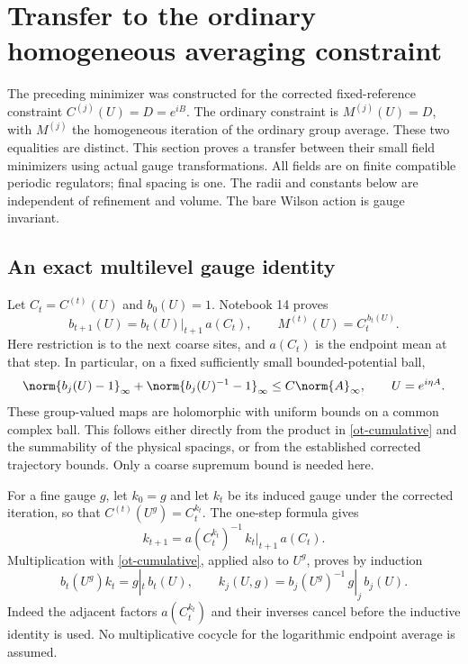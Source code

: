 \section{Transfer to the ordinary homogeneous averaging constraint}
\label{ot-section}

The preceding minimizer was constructed for the corrected
fixed-reference constraint $C^{(j)}(U)=D=e^{iB}$. The ordinary
constraint is $M^{(j)}(U)=D$, with $M^{(j)}$ the homogeneous
iteration of the ordinary group average. These two equalities
are distinct. This section proves a transfer between their small
field minimizers using actual gauge transformations. All fields
are on finite compatible periodic regulators; final spacing is
one. The radii and constants below are independent of refinement
and volume. The bare Wilson action is gauge invariant.

\subsection{An exact multilevel gauge identity}

Let $C_t=C^{(t)}(U)$ and $b_0(U)=1$. Notebook 14 proves
\begin{equation}\label{ot-cumulative}
 b_{t+1}(U)=b_t(U)|_{t+1}\,a(C_t),\qquad
 M^{(t)}(U)=C_t^{\,b_t(U)}.
\end{equation}
Here restriction is to the next coarse sites, and
$a(C_t)$ is the endpoint mean at that step. In particular,
on a fixed sufficiently small bounded-potential ball,
\begin{equation}\label{ot-b-bound}
 \norm{b_j(U)-1}_\infty+\norm{b_j(U)^{-1}-1}_\infty
       \le C\norm{A}_\infty,\qquad U=e^{i\eta A}.
\end{equation}
These group-valued maps are holomorphic with uniform bounds
on a common complex ball. This follows either directly from
the product in \eqref{ot-cumulative} and the summability of
the physical spacings, or from the established corrected
trajectory bounds. Only a coarse supremum bound is needed here.

For a fine gauge $g$, let $k_0=g$ and let $k_t$ be its induced
gauge under the corrected iteration, so that
$C^{(t)}(U^g)=C_t^{k_t}$. The one-step formula gives
\[
 k_{t+1}=a(C_t^{k_t})^{-1}\,k_t|_{t+1}\,a(C_t).
\]
Multiplication with \eqref{ot-cumulative}, applied also to
$U^g$, proves by induction
\begin{equation}\label{ot-exact-induced}
 b_t(U^g)k_t=g|_t\,b_t(U),\qquad
 k_j(U,g)=b_j(U^g)^{-1}\,g|_j\,b_j(U).
\end{equation}
Indeed the adjacent factors $a(C_t^{k_t})$ and their inverses
cancel before the inductive identity is used. No multiplicative
cocycle for the logarithmic endpoint average is assumed.

